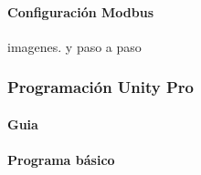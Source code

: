 	\paragraph{Configuración Modbus}
	imagenes. y paso a paso

	\subsubsection{Programación Unity Pro}
	\paragraph{Guia}
	\paragraph{Programa básico}
	\newpage

